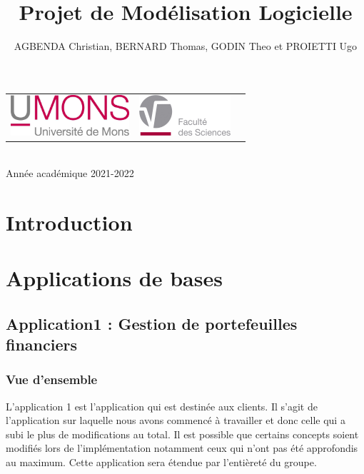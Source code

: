 \documentclass{article}
\begin{document}
\begin{titlepage}
\begin{center}
        \begin{center}
            \begin{tabular}[t]{c c c}
                \includegraphics[height=1.5cm]{ressources/logoumons.jpg} &
                \includegraphics[height=1.5cm]{ressources/logofs.jpg} &
            \end{tabular}
        \end{center}~\\
        
        {\large Année académique 2021-2022}
        
    \end{center}
\end{titlepage}

\title{Projet de Modélisation Logicielle}
\author{AGBENDA Christian, BERNARD Thomas, GODIN Theo et PROIETTI Ugo}
\maketitle
\tableofcontents
\newpage


\section{Introduction}

\section{Applications de bases}

	\subsection{Application1 : Gestion de portefeuilles financiers}

		\subsubsection{Vue d'ensemble}
			L'application 1 est l'application qui est destinée aux clients. Il s'agit de l'application sur
			laquelle nous avons commencé à travailler et donc celle qui a subi le plus de modifications au total.
			Il est possible que certains concepts soient modifiés lors de l'implémentation notamment ceux qui 
			n'ont pas été approfondis au maximum. Cette application sera étendue par l'entièreté du groupe.
\end{document}
